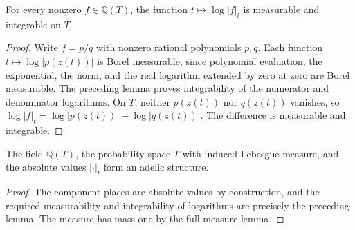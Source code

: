 \begin{lemma}
\label{lem:rational-archimedean-log-integrable}
\leanok
For every nonzero $f\in\mathbb Q(T)$, the function
$t\mapsto\log|f|_t$ is measurable and integrable on $T$.
\end{lemma}
\begin{proof}
Write $f=p/q$ with nonzero rational polynomials $p,q$. Each function
$t\mapsto\log|p(z(t))|$ is Borel measurable, since polynomial evaluation,
the exponential, the norm, and the real logarithm extended by zero at zero
are Borel measurable. The preceding lemma proves integrability of the
numerator and denominator logarithms. On $T$, neither $p(z(t))$ nor
$q(z(t))$ vanishes, so
$\log|f|_t=\log|p(z(t))|-\log|q(z(t))|$.
The difference is measurable and integrable.
\end{proof}

\begin{definition}
\label{def:rational-archimedean-structure}
\leanok
The field $\mathbb Q(T)$, the probability space $T$ with induced Lebesgue
measure, and the absolute values $|\cdot|_t$ form an adelic structure.
\end{definition}
\begin{proof}
The component places are absolute values by construction, and the required
measurability and integrability of logarithms are precisely the preceding
lemma. The measure has mass one by the full-measure lemma.
\end{proof}



